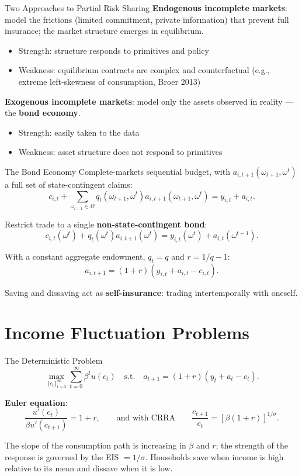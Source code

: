 \documentclass[blue]{beamer}
\begin{document}
	\begin{frame}{Two Approaches to Partial Risk Sharing}
		\textbf{Endogenous incomplete markets}: model the frictions (limited commitment, private information) that prevent full insurance; the market structure emerges in equilibrium.
		\begin{itemize}
			\item Strength: structure responds to primitives and policy
			\item Weakness: equilibrium contracts are complex and counterfactual (e.g., extreme left-skewness of consumption, Broer 2013)
		\end{itemize}
		
		\bigskip
		\textbf{Exogenous incomplete markets}: model only the assets observed in reality --- the \textbf{bond economy}.
		\begin{itemize}
			\item Strength: easily taken to the data
			\item Weakness: asset structure does not respond to primitives
		\end{itemize}
	\end{frame}
	
	\begin{frame}{The Bond Economy}
		Complete-markets sequential budget, with $a_{i,t+1}(\omega_{t+1}, \omega^t)$ a full set of state-contingent claims:
		\[
		c_{i,t} + \sum_{\omega_{t+1} \in \Omega} q_t(\omega_{t+1}, \omega^t) a_{i,t+1}(\omega_{t+1}, \omega^t) = y_{i,t} + a_{i,t}.
		\]
		
		Restrict trade to a single \textbf{non-state-contingent bond}:
		\[
		c_{i,t}(\omega^t) + q_t(\omega^t) a_{i,t+1}(\omega^t) = y_{i,t}(\omega^t) + a_{i,t}(\omega^{t-1}).
		\]
		
		With a constant aggregate endowment, $q_t = q$ and $r = 1/q - 1$:
		\[
		a_{i,t+1} = (1+r)(y_{i,t} + a_{i,t} - c_{i,t}).
		\]
		
		Saving and dissaving act as \textbf{self-insurance}: trading intertemporally with oneself.
	\end{frame}
	
	\section{Income Fluctuation Problems}
	
	\begin{frame}{The Deterministic Problem}
		\[
		\max_{\{c_t\}_{t=0}^{\infty}} \sum_{t=0}^{\infty} \beta^t u(c_t) \quad \text{s.t.} \quad a_{t+1} = (1+r)(y_t + a_t - c_t).
		\]
		
		\textbf{Euler equation}:
		\[
		\frac{u'(c_t)}{\beta u'(c_{t+1})} = 1 + r, \qquad \text{and with CRRA} \qquad \frac{c_{t+1}}{c_t} = [\beta(1+r)]^{1/\sigma}.
		\]
		
		\bigskip
		The slope of the consumption path is increasing in $\beta$ and $r$; the strength of the response is governed by the EIS $= 1/\sigma$. Households save when income is high relative to its mean and dissave when it is low.
	\end{frame}
	
\end{document}

